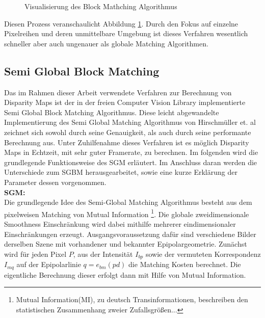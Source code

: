 \begin{figure}
	\begin{center}
	\end{center}
	\caption{Visualisierung des Block Mathching Algorithmus}
	\label{fig:block_matching}
\end{figure}

\noindent
Diesen Prozess veranschaulicht Abbildung \ref{fig:block_matching}. Durch den Fokus auf einzelne Pixelreihen und deren unmittelbare Umgebung ist dieses Verfahren wesentlich schneller aber auch ungenauer als globale Matching Algorithmen. 


\subsection{Semi Global Block Matching}
\label{subsec:stereo_matching_sgbm}
Das im Rahmen dieser Arbeit verwendete Verfahren zur Berechnung von Disparity Maps ist der in der freien Computer Vision Library implementierte Semi Global Block Matching Algorithmus. Diese leicht abgewandelte Implementierung des Semi Global Matching Algorithmus von Hirschmüller et. al \cite{hirschmuller2005sgm} zeichnet sich sowohl durch seine Genauigkeit, als auch durch seine performante Berechnung aus. Unter Zuhilfenahme dieses Verfahren ist es möglich Disparity Maps in Echtzeit, mit sehr guter Framerate, zu berechnen. Im folgenden wird die grundlegende Funktionsweise des SGM erläutert. Im Anschluss daran werden die Unterschiede zum SGBM herausgearbeitet, sowie eine kurze Erklärung der Parameter dessen vorgenommen.\\

\noindent
\textbf{SGM:} \\
Die grundlegende Idee des Semi-Global Matching Algorithmus besteht aus dem pixelweisen Matching von Mutual Information \footnote{Mutual Information(MI), zu deutsch Transinformationen, beschreiben den statistischen Zusammenhang zweier Zufallsgrößen...}. Die globale zweidimensionale Smoothness Einschränkung wird dabei mithilfe mehrerer eindimensionaler Einschränkungen erzeugt. Ausgangsvoraussetzung dafür sind verschiedene Bilder derselben Szene mit vorhandener und bekannter Epipolargeometrie. 
Zunächst wird für jeden Pixel $P$, aus der Intensität $I_{bp}$ sowie der vermuteten Korrespondenz $I_{mq}$ auf der Epipolarlinie $q=e_{bm}(pd)$ die Matching Kosten berechnet. Die eigentliche Berechnung dieser erfolgt dann mit Hilfe von Mutual Information.

